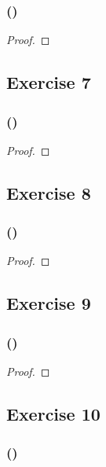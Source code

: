 \documentclass[14pt]{extarticle}
\begin{document}
\subsubsection{()}

\begin{proof}

\end{proof}

\subsection{Exercise 7}

\subsubsection{()}

\begin{proof}

\end{proof}

\subsection{Exercise 8}

\subsubsection{()}

\begin{proof}

\end{proof}

\subsection{Exercise 9}

\subsubsection{()}

\begin{proof}

\end{proof}

\subsection{Exercise 10}

\subsubsection{()}
\end{document}
